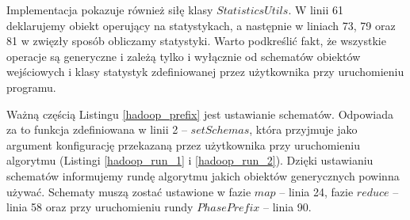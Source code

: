 \documentclass[magisterska]{pracamgr}
\begin{document}
Implementacja pokazuje również siłę klasy \(StatisticsUtils\). W linii 61 deklarujemy obiekt operujący na statystykach, a następnie w liniach 73, 79 oraz 81 w zwięzły sposób obliczamy statystyki. Warto podkreślić fakt, że wszystkie operacje są generyczne i zależą tylko i wyłącznie od schematów obiektów wejściowych i klasy statystyk zdefiniowanej przez użytkownika przy uruchomieniu programu.

Ważną częścią Listingu \ref{hadoop_prefix} jest ustawianie schematów. Odpowiada za to funkcja zdefiniowana w linii 2 -- \(setSchemas\), która przyjmuje jako argument konfigurację przekazaną przez użytkownika przy uruchomieniu algorytmu (Listingi \ref{hadoop_run_1} i \ref{hadoop_run_2}). Dzięki ustawianiu schematów informujemy rundę algorytmu jakich obiektów generycznych powinna używać. Schematy muszą zostać ustawione w fazie \(map\) -- linia 24, fazie \(reduce\) -- linia 58 oraz przy uruchomieniu rundy \(PhasePrefix\) -- linia 90.
\end{document}
